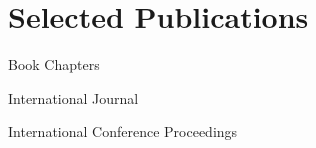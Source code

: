 \section{Selected Publications}


\begin{pubSubsectionNum}{Book Chapters}
  \item \href{http://asrl.utias.utoronto.ca/~tdb/slam/}{}
\end{pubSubsectionNum}

\vspace{-2mm}
\begin{pubSubsectionNum}{International Journal}
  \item {}
  \item {}
  \item {}
  \item {}
  \item {}
  \item {}
  \item {}
\end{pubSubsectionNum}

\vspace{-2mm}
\begin{pubSubsectionNum}{International Conference Proceedings}
  \item {}
  \item {}
  \item {}
  \item {}
  \item {}
  \item {}
  \item {}
  \item {}
  \item {}
  \item {}
\end{pubSubsectionNum}

